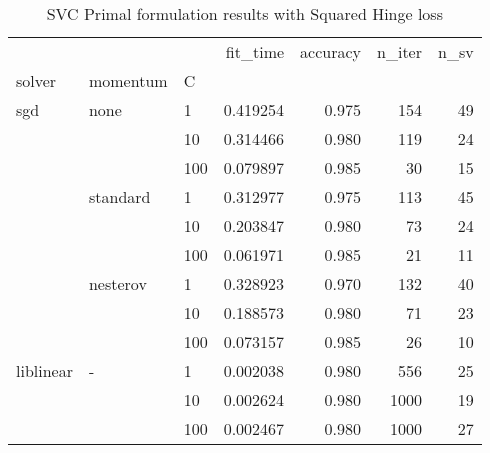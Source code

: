 \begin{table}[H]
\centering
\caption{SVC Primal formulation results with Squared Hinge loss}
\label{primal_l2_svc_cv_results}
\begin{tabular}{lllrrrr}
\toprule
          &   &     &  fit\_time &  accuracy &  n\_iter &  n\_sv \\
solver & momentum & C &           &           &         &       \\
\midrule
sgd & none & 1   &  0.419254 &     0.975 &     154 &    49 \\
          &   & 10  &  0.314466 &     0.980 &     119 &    24 \\
          &   & 100 &  0.079897 &     0.985 &      30 &    15 \\
          & standard & 1   &  0.312977 &     0.975 &     113 &    45 \\
          &   & 10  &  0.203847 &     0.980 &      73 &    24 \\
          &   & 100 &  0.061971 &     0.985 &      21 &    11 \\
          & nesterov & 1   &  0.328923 &     0.970 &     132 &    40 \\
          &   & 10  &  0.188573 &     0.980 &      71 &    23 \\
          &   & 100 &  0.073157 &     0.985 &      26 &    10 \\
liblinear & - & 1   &  0.002038 &     0.980 &     556 &    25 \\
          &   & 10  &  0.002624 &     0.980 &    1000 &    19 \\
          &   & 100 &  0.002467 &     0.980 &    1000 &    27 \\
\bottomrule
\end{tabular}
\end{table}
